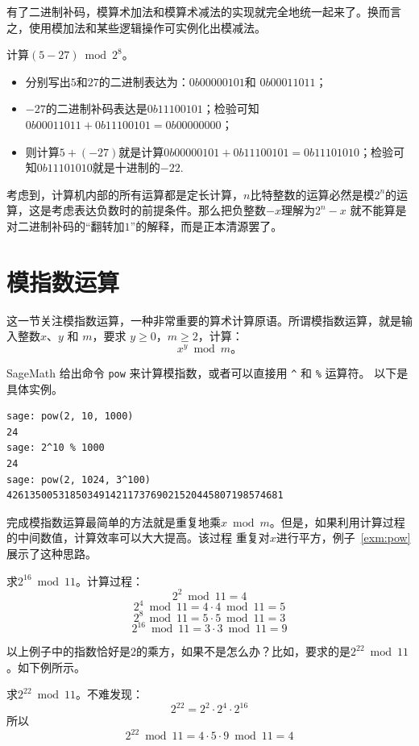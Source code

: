 有了二进制补码，模算术加法和模算术减法的实现就完全地统一起来了。换而言之，使用模加法和某些逻辑操作可实例化出模减法。
\begin{example}
计算$ (5 - 27) \bmod 2^8$。
\begin{itemize}
\item 分别写出$5$和$27$的二进制表达为：$0b00000101$和 $0b00011011$；

\item $-27$的二进制补码表达是$0b11100101$；检验可知$0b00011011 + 0b11100101 = 0b00000000$；

\item 则计算$5 + (-27)$就是计算$0b00000101 + 0b11100101 = 0b11101010$；检验可知$0b11101010$就是十进制的$-22$.
\end{itemize}  
\end{example}
考虑到，计算机内部的所有运算都是定长计算，$n$比特整数的运算必然是模$2^n$的运算，这是考虑表达负数时的前提条件。那么把负整数$-x$理解为$ 2^n - x$
就不能算是对二进制补码的“翻转加$1$”的解释，而是正本清源罢了。

\section{模指数运算}
\label{sec:mod-pow}
这一节关注模指数运算，一种非常重要的算术计算原语。所谓模指数运算，就是输入整数$x$、$y$ 和 $m$，要求 $y\geq 0$，$m\geq 2$，计算：
\[ x^y \bmod m \text{。}\]

SageMath 给出命令 \lstinline{pow} 来计算模指数，或者可以直接用 \lstinline{^} 和 \lstinline{%} 运算符。
以下是具体实例。
\begin{lstlisting}
sage: pow(2, 10, 1000)
24
sage: 2^10 % 1000
24
sage: pow(2, 1024, 3^100)
426135005318503491421173769021520445807198574681
\end{lstlisting}	
 
完成模指数运算最简单的方法就是重复地乘$x \bmod m$。但是，如果利用计算过程的中间数值，计算效率可以大大提高。该过程
重复对$x$进行平方，例子~\ref{exm:pow}展示了这种思路。

\begin{example}
\label{exm:pow}
求$2^{16} \bmod 11$。计算过程：
\[2^2 \bmod 11 = 4\] 
\[2^4 \bmod 11 = 4 \cdot 4 \bmod 11 = 5\]
\[2^8 \bmod 11 = 5 \cdot 5 \bmod 11 = 3 \]
\[2^{16} \bmod 11 = 3 \cdot 3 \bmod 11 = 9 \]
\end{example}

以上例子中的指数恰好是$2$的乘方，如果不是怎么办？比如，要求的是$2^{22} \bmod 11$。如下例所示。
\begin{example}
\label{exm:pow2}
求$2^{22} \bmod 11$。不难发现：
\[2^{22} = 2^2 \cdot 2^4 \cdot 2^{16} \]
所以 
\[2^{22} \bmod 11 = 4\cdot 5 \cdot 9  \bmod 11 = 4 \]
\end{example}

